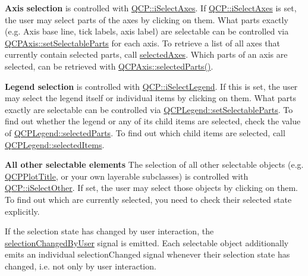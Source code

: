 {\bfseries Axis selection} is controlled with \hyperlink{namespace_q_c_p_a2ad6bb6281c7c2d593d4277b44c2b037ad6644ac55bef621645326e9dd7469caa}{Q\-C\-P\-::i\-Select\-Axes}. If \hyperlink{namespace_q_c_p_a2ad6bb6281c7c2d593d4277b44c2b037ad6644ac55bef621645326e9dd7469caa}{Q\-C\-P\-::i\-Select\-Axes} is set, the user may select parts of the axes by clicking on them. What parts exactly (e.\-g. Axis base line, tick labels, axis label) are selectable can be controlled via \hyperlink{class_q_c_p_axis_a513f9b9e326c505d9bec54880031b085}{Q\-C\-P\-Axis\-::set\-Selectable\-Parts} for each axis. To retrieve a list of all axes that currently contain selected parts, call \hyperlink{class_q_custom_plot_aa6baf867e8beb96ed5bd471f83ece903}{selected\-Axes}. Which parts of an axis are selected, can be retrieved with \hyperlink{class_q_c_p_axis_a08323248a1cba4750ef07ceea159e0b3}{Q\-C\-P\-Axis\-::selected\-Parts()}.

{\bfseries Legend selection} is controlled with \hyperlink{namespace_q_c_p_a2ad6bb6281c7c2d593d4277b44c2b037a269c9af298e257d1108edec0432b5513}{Q\-C\-P\-::i\-Select\-Legend}. If this is set, the user may select the legend itself or individual items by clicking on them. What parts exactly are selectable can be controlled via \hyperlink{class_q_c_p_legend_a9ce60aa8bbd89f62ae4fa83ac6c60110}{Q\-C\-P\-Legend\-::set\-Selectable\-Parts}. To find out whether the legend or any of its child items are selected, check the value of \hyperlink{class_q_c_p_legend_abbbf1b2d6a149013527ed87b0780894a}{Q\-C\-P\-Legend\-::selected\-Parts}. To find out which child items are selected, call \hyperlink{class_q_c_p_legend_ac93eaf236e911d67aa8b88942ef45c5e}{Q\-C\-P\-Legend\-::selected\-Items}.

{\bfseries All other selectable elements} The selection of all other selectable objects (e.\-g. \hyperlink{class_q_c_p_plot_title}{Q\-C\-P\-Plot\-Title}, or your own layerable subclasses) is controlled with \hyperlink{namespace_q_c_p_a2ad6bb6281c7c2d593d4277b44c2b037af67a50bc26147a13b551b3a625374949}{Q\-C\-P\-::i\-Select\-Other}. If set, the user may select those objects by clicking on them. To find out which are currently selected, you need to check their selected state explicitly.

If the selection state has changed by user interaction, the \hyperlink{class_q_custom_plot_a500c64a109bc773c973ad274f2fa4190}{selection\-Changed\-By\-User} signal is emitted. Each selectable object additionally emits an individual selection\-Changed signal whenever their selection state has changed, i.\-e. not only by user interaction.

